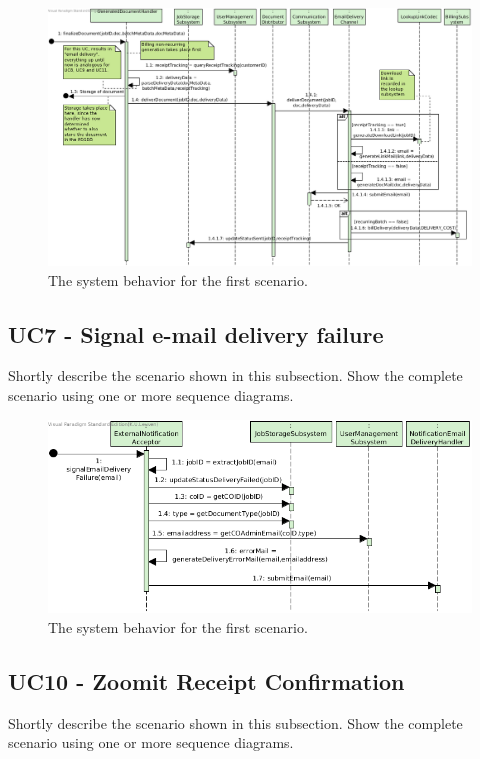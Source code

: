 \begin{figure}[!htp]
    \centering
    \includegraphics[width=\textwidth]{figures/UC6 - Deliver document via e-mail.png}
    \caption{The system behavior for the first scenario.
        }\label{fig:seq_uc6}
\end{figure}

\subsection{UC7 - Signal e-mail delivery failure}
Shortly describe the scenario shown in this subsection.
Show the complete scenario using one or more sequence diagrams.

\begin{figure}[!htp]
    \centering
    \includegraphics[width=\textwidth]{figures/UC7 - Signal e-mail delivery failure.png}
    \caption{The system behavior for the first scenario.
        }\label{fig:seq_uc7}
\end{figure}

\subsection{UC10 - Zoomit Receipt Confirmation}
Shortly describe the scenario shown in this subsection.
Show the complete scenario using one or more sequence diagrams.

